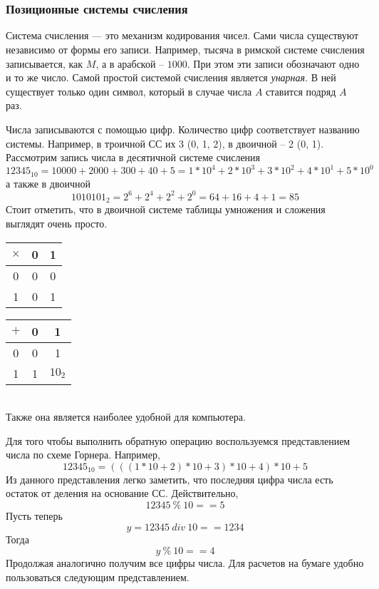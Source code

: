 \chapter{}
%
\subsection*{Позиционные системы счисления}

Система счисления --- это механизм кодирования чисел. Сами числа существуют независимо от формы его записи. 
Например, тысяча в римской системе счисления записывается, как $M$, а в арабской -- $1000$. При этом эти записи обозначают одно и то же число. 
Самой простой системой счисления является \emph{унарная}.
В ней существует только один символ, который в случае числа $A$ ставится подряд $A$ раз.

Числа записываются с помощью цифр. Количество цифр соответствует названию системы. Например, в троичной СС их 3 (0, 1, 2), в двоичной -- 2 (0, 1).
Рассмотрим запись числа в  десятичной системе счисления 
\[12345_{10} = 10000+2000+300+40+5 = 1*10^{4} + 2*10^3+3*10^2 + 4*10^1 + 5*10^0\]
а также в двоичной
\[1010101_2 = 2^6+2^4+2^2+2^0 = 64+16+4+1 = 85\]
Стоит отметить, что в двоичной системе таблицы умножения и сложения выглядят очень просто.
\qquad { } \\ 
\begin{tabular}{c|cc}
	$\times$ & 0 & 1 \\
	\hline
	0 & 0 & 0 \\
	1 & 0 & 1
\end{tabular}\qquad
%  
\begin{tabular}{c|cc}
	$+$ & 0 & 1 \\
	\hline
	0 & 0 & 1 \\
	1 & 1 & $10_2$
\end{tabular}
\\
Также она является  наиболее удобной для компьютера.

Для того чтобы выполнить обратную операцию воспользуемся представлением числа по схеме Горнера. Например, 
\[12345_{10}= (((1*10+2)*10+3)*10+4)*10+5\] 
Из данного представления легко заметить, что последняя цифра числа есть остаток от деления на основание СС. Действительно, 
\[12345~\%~10 == 5\]
Пусть теперь 
\[y = 12345~div~10 == 1234\]
Тогда 
\[y~\%~10 == 4\]
Продолжая аналогично получим все цифры числа. Для расчетов на бумаге удобно пользоваться следующим представлением. 

